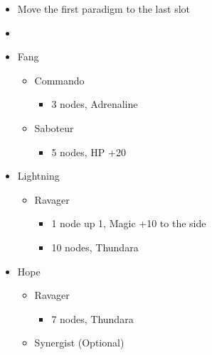 \begin{menu}
\begin{multicols}{2}
\begin{itemize}
    \paradigm
    \begin{itemize}
        \item Move the first paradigm to the last slot
        \item {}%
{\paradigmline{[\com]}{\com}{\rav}}
{\paradigmline{[\com]}{\rav}{\rav}}%
{\paradigmline{(\sab)}{(\rav)}{\rav}}%
{\paradigmline{\sen}{(\rav)}{(\rav)}}%
{\paradigmline[5]{\textit{\sab}}{\textit{(\rav)}}{\textit{\syn}}}%
{\paradigmline{\com}{\rav}{\rav}}
    \end{itemize}
    \crystarium
    \begin{itemize}
        \item Fang
        \begin{itemize}
            \item Commando
            \begin{itemize}
                \item 3 nodes, Adrenaline
            \end{itemize}
            \item Saboteur
            \begin{itemize}
                \item 5 nodes, HP +20
            \end{itemize}
        \end{itemize}
        \item Lightning
        \begin{itemize}
            \item Ravager
            \begin{itemize}
                \item 1 node up 1, Magic +10 to the side
                \item 10 nodes, Thundara
            \end{itemize}
        \end{itemize}
        \item Hope
        \begin{itemize}
            \item Ravager
            \begin{itemize}
                 \item 7 nodes, Thundara
            \end{itemize}
            \item Synergist (Optional)

\end{itemize}
\end{itemize}
\end{itemize}
\end{multicols}
\end{menu}
